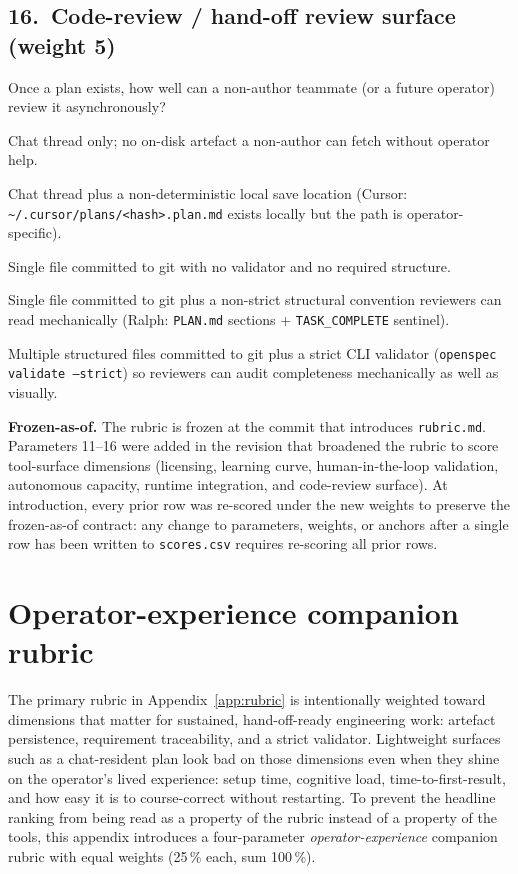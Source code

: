 \subsection*{16.\ Code-review / hand-off review surface (weight 5)}
Once a plan exists, how well can a non-author teammate (or a future
operator) review it asynchronously?
\begin{description}[leftmargin=11mm, labelindent=0mm]
\item[1] Chat thread only; no on-disk artefact a non-author can fetch
without operator help.
\item[2] Chat thread plus a non-deterministic local save location
(Cursor: \texttt{\textasciitilde{}/.cursor/plans/<hash>.plan.md}
exists locally but the path is operator-specific).
\item[3] Single file committed to git with no validator and no
required structure.
\item[4] Single file committed to git plus a non-strict structural
convention reviewers can read mechanically (Ralph:
\texttt{PLAN.md} sections + \texttt{TASK\_COMPLETE} sentinel).
\item[5] Multiple structured files committed to git plus a strict CLI
validator (\texttt{openspec validate --strict}) so reviewers can
audit completeness mechanically as well as visually.
\end{description}

\textbf{Frozen-as-of.} The rubric is frozen at the commit that
introduces \texttt{rubric.md}. Parameters 11--16 were added in the
revision that broadened the rubric to score tool-surface dimensions
(licensing, learning curve, human-in-the-loop validation, autonomous
capacity, runtime integration, and code-review surface). At
introduction, every prior row was re-scored under the new weights to
preserve the frozen-as-of contract: any change to parameters, weights,
or anchors after a single row has been written to \texttt{scores.csv}
requires re-scoring all prior rows.

\section{Operator-experience companion rubric}\label{app:opx-rubric}

The primary rubric in Appendix~\ref{app:rubric} is intentionally
weighted toward dimensions that matter for sustained, hand-off-ready
engineering work: artefact persistence, requirement traceability,
and a strict validator. Lightweight surfaces such as a chat-resident
plan look bad on those dimensions even when they shine on the
operator's lived experience: setup time, cognitive load,
time-to-first-result, and how easy it is to course-correct without
restarting. To prevent the headline ranking from being read as a
property of the rubric instead of a property of the tools, this
appendix introduces a four-parameter \emph{operator-experience}
companion rubric with equal weights (25\,\% each, sum 100\,\%).

